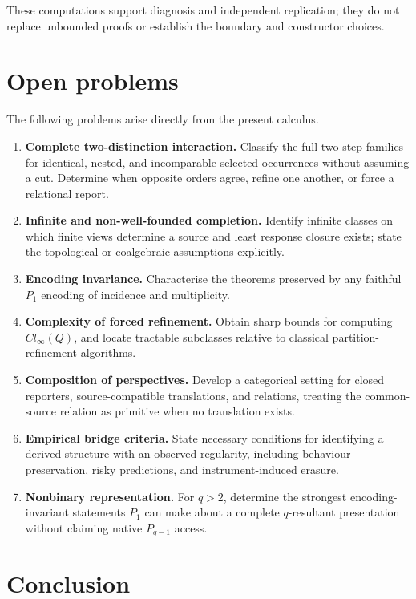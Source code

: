 \documentclass[11pt,a4paper]{article}
\begin{document}
These computations support diagnosis and independent replication; they
do not replace unbounded proofs or establish the boundary and
constructor choices.

\section{Open problems}

The following problems arise directly from the present calculus.

\begin{enumerate}
\def\labelenumi{\arabic{enumi}.}
\item
  \textbf{Complete two-distinction interaction.} Classify the full
  two-step families for identical, nested, and incomparable selected
  occurrences without assuming a cut. Determine when opposite orders
  agree, refine one another, or force a relational report.
\item
  \textbf{Infinite and non-well-founded completion.} Identify infinite
  classes on which finite views determine a source and least response
  closure exists; state the topological or coalgebraic assumptions
  explicitly.
\item
  \textbf{Encoding invariance.} Characterise the theorems preserved by
  any faithful \(P_{1}\) encoding of incidence and multiplicity.
\item
  \textbf{Complexity of forced refinement.} Obtain sharp bounds for
  computing \({Cl}_{\infty}(Q)\), and locate tractable subclasses
  relative to classical partition-refinement algorithms.
\item
  \textbf{Composition of perspectives.} Develop a categorical setting
  for closed reporters, source-compatible translations, and relations,
  treating the common-source relation as primitive when no translation
  exists.
\item
  \textbf{Empirical bridge criteria.} State necessary conditions for
  identifying a derived structure with an observed regularity, including
  behaviour preservation, risky predictions, and instrument-induced
  erasure.
\item
  \textbf{Nonbinary representation.} For \(q > 2\), determine the
  strongest encoding-invariant statements \(P_{1}\) can make about a
  complete \(q\)-resultant presentation without claiming native
  \(P_{q - 1}\) access.
\end{enumerate}

\section{Conclusion}
\end{document}
